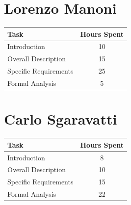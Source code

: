 \documentclass{Configuration_Files/PoliMi3i_thesis}
\begin{document}
\section{Lorenzo Manoni}

\begin{table}[H]
    \centering 
    \begin{tabular}{|l|c|}
    \hline
    \rowcolor{bluepoli!40}
    \textbf{Task} & \textbf{Hours Spent} \T\B \\
    \hline
    Introduction & 10\T\B \\
    \hline
    Overall Description & 15\T\B \\
    \hline
    Specific Requirements & 25\T\B \\
    \hline
    Formal Analysis & 5\T\B \\
    \hline
    \end{tabular}
\end{table}

\section{Carlo Sgaravatti}

\begin{table}[H]
    \centering 
    \begin{tabular}{|l|c|}
    \hline
    \rowcolor{bluepoli!40}
    \textbf{Task} & \textbf{Hours Spent} \T\B \\
    \hline
    Introduction & 8\T\B \\
    \hline
    Overall Description & 10\T\B \\
    \hline
    Specific Requirements & 15\T\B \\
    \hline
    Formal Analysis & 22\T\B \\
    \hline
    \end{tabular}
\end{table}


\cleardoublepage
{} %


\cleardoublepage
\end{document}
